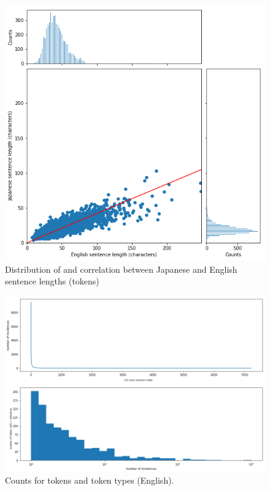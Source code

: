 \documentclass[answers]{exam}
\begin{document}
\begin{CJK}{UTF8}{min}
\begin{figure}
  \centering
  \includegraphics[width=\linewidth]{fig-corr-chars}
  \caption[Sentence lenths (characters)]%
  {Distribution of and correlation between Japanese and English sentence lengths (tokens)}
  \label{fig:corr-chars}
\end{figure}

\begin{figure}
  \centering
  \includegraphics[width=\linewidth]{fig-toks-en}
  \caption{Counts for tokens and token types (English).}
  \label{fig:toks-en}
\end{figure}


\end{CJK}
\end{document}
